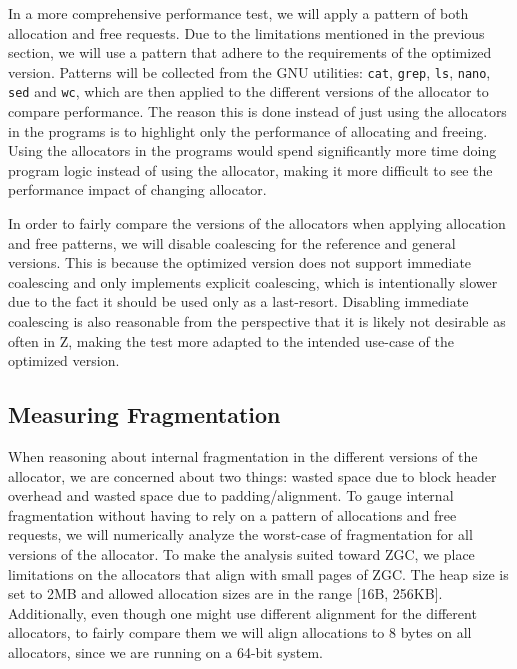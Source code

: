 In a more comprehensive performance test, we will apply a pattern of both allocation and free requests. Due to the limitations mentioned in the previous section, we will use a pattern that adhere to the requirements of the optimized version. Patterns will be collected from the GNU utilities: \texttt{cat}, \texttt{grep}, \texttt{ls}, \texttt{nano}, \texttt{sed} and \texttt{wc}, which are then applied to the different versions of the allocator to compare performance. The reason this is done instead of just using the allocators in the programs is to highlight only the performance of allocating and freeing. Using the allocators in the programs would spend significantly more time doing program logic instead of using the allocator, making it more difficult to see the performance impact of changing allocator.

In order to fairly compare the versions of the allocators when applying allocation and free patterns, we will disable coalescing for the reference and general versions. This is because the optimized version does not support immediate coalescing and only implements explicit coalescing, which is intentionally slower due to the fact it should be used only as a last-resort. Disabling immediate coalescing is also reasonable from the perspective that it is likely not desirable as often in Z, making the test more adapted to the intended use-case of the optimized version.


\subsection{Measuring Fragmentation}

When reasoning about internal fragmentation in the different versions of the allocator, we are concerned about two things: wasted space due to block header overhead and wasted space due to padding/alignment. To gauge internal fragmentation without having to rely on a pattern of allocations and free requests, we will numerically analyze the worst-case of fragmentation for all versions of the allocator. To make the analysis suited toward ZGC, we place limitations on the allocators that align with small pages of ZGC. The heap size is set to 2MB and allowed allocation sizes are in the range [16B, 256KB]. Additionally, even though one might use different alignment for the different allocators, to fairly compare them we will align allocations to 8 bytes on all allocators, since we are running on a 64-bit system.

